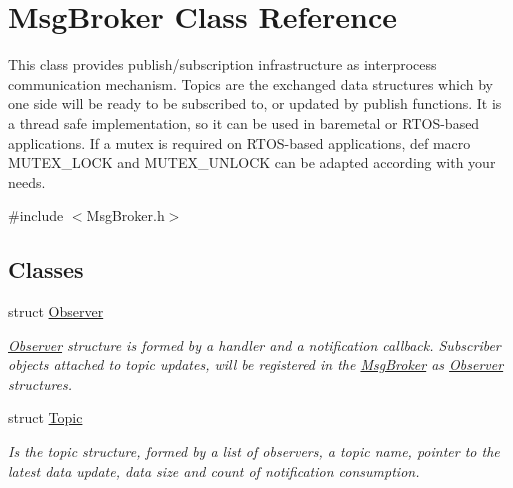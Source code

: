 \hypertarget{class_msg_broker}{\section{Msg\-Broker Class Reference}
\label{class_msg_broker}
}


This class provides publish/subscription infrastructure as interprocess communication mechanism. Topics are the exchanged data structures which by one side will be ready to be subscribed to, or updated by publish functions. It is a thread safe implementation, so it can be used in baremetal or R\-T\-O\-S-\/based applications. If a mutex is required on R\-T\-O\-S-\/based applications, def macro M\-U\-T\-E\-X\-\_\-\-L\-O\-C\-K and M\-U\-T\-E\-X\-\_\-\-U\-N\-L\-O\-C\-K can be adapted according with your needs.  




{\ttfamily \#include $<$Msg\-Broker.\-h$>$}

\subsection*{Classes}
\begin{DoxyCompactItemize}
\item 
struct \hyperlink{struct_msg_broker_1_1_observer}{Observer}
\begin{DoxyCompactList}\small\item\em \hyperlink{struct_msg_broker_1_1_observer}{Observer} structure is formed by a handler and a notification callback. Subscriber objects attached to topic updates, will be registered in the \hyperlink{class_msg_broker}{Msg\-Broker} as \hyperlink{struct_msg_broker_1_1_observer}{Observer} structures. \end{DoxyCompactList}\item 
struct \hyperlink{struct_msg_broker_1_1_topic}{Topic}
\begin{DoxyCompactList}\small\item\em Is the topic structure, formed by a list of observers, a topic name, pointer to the latest data update, data size and count of notification consumption. \end{DoxyCompactList}\end{DoxyCompactItemize}
